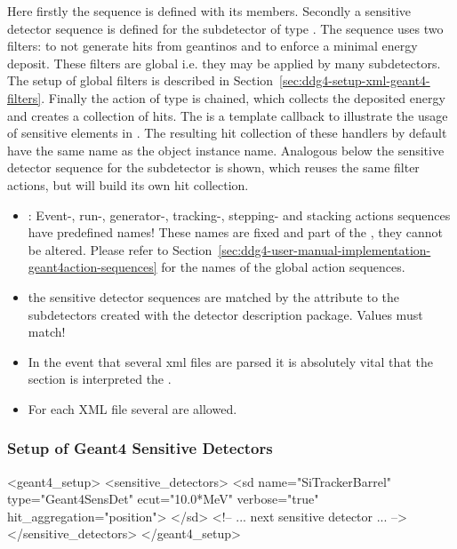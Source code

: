 Here firstly the  sequence is defined with its members. 
Secondly a sensitive detector sequence is defined for the subdetector
 of type .
The sequence uses two filters:  to not generate hits
from geantinos and  to enforce a minimal energy deposit.
These filters are global i.e. they may be applied by many subdetectors.
The setup of global filters is described in 
Section~\ref{sec:ddg4-setup-xml-geant4-filters}.
Finally the action  of type 
is chained, which collects the deposited energy and 
creates a collection of hits. The  is a template
callback to illustrate the usage of sensitive elements in \DDG.
The resulting hit collection of these handlers by default have the same name as the
object instance name.
Analogous below the sensitive detector sequence for the subdetector 
 is shown, which reuses the same filter actions, but will build its own
hit collection.

\noindent
{}
\begin{itemize}\itemcompact
\item {}: Event-, run-, generator-, tracking-,
    stepping- and stacking actions sequences have predefined names! 
    These names are fixed and part of the , they cannot be altered.
    Please refer to 
    Section~\ref{sec:ddg4-user-manual-implementation-geant4action-sequences} 
    for the names of the global action sequences.
\item the sensitive detector sequences are matched by the attribute  to the 
    subdetectors created with the \DDhep detector description package. Values must match!
\item In the event that several xml files are parsed it is absolutely vital that 
    the  section is interpreted  the .
\item For each XML file several  are allowed.
\noindent
\end{itemize}

\subsubsection{Setup of Geant4 Sensitive Detectors}
\label{sec:ddg4-setup-xml-geant4-sensitive detectors}
\begin{code}
  <geant4_setup>
    <sensitive_detectors>
      <sd name="SiTrackerBarrel" 
          type="Geant4SensDet" 
          ecut="10.0*MeV" 
          verbose="true" 
          hit_aggregation="position">
      </sd>
      <!-- ...  next sensitive detector ... -->
    </sensitive_detectors>
  </geant4_setup>
\end{code}




